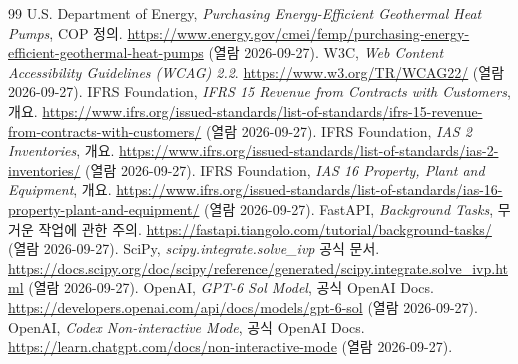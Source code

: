 \documentclass[11pt,a4paper]{article}
\begin{document}
\begin{thebibliography}{99}
 U.S. Department of Energy, \emph{Purchasing Energy-Efficient Geothermal Heat Pumps}, COP 정의. \url{https://www.energy.gov/cmei/femp/purchasing-energy-efficient-geothermal-heat-pumps} (열람 2026-09-27).
 W3C, \emph{Web Content Accessibility Guidelines (WCAG) 2.2}. \url{https://www.w3.org/TR/WCAG22/} (열람 2026-09-27).
 IFRS Foundation, \emph{IFRS 15 Revenue from Contracts with Customers}, 개요. \url{https://www.ifrs.org/issued-standards/list-of-standards/ifrs-15-revenue-from-contracts-with-customers/} (열람 2026-09-27).
 IFRS Foundation, \emph{IAS 2 Inventories}, 개요. \url{https://www.ifrs.org/issued-standards/list-of-standards/ias-2-inventories/} (열람 2026-09-27).
 IFRS Foundation, \emph{IAS 16 Property, Plant and Equipment}, 개요. \url{https://www.ifrs.org/issued-standards/list-of-standards/ias-16-property-plant-and-equipment/} (열람 2026-09-27).
 FastAPI, \emph{Background Tasks}, 무거운 작업에 관한 주의. \url{https://fastapi.tiangolo.com/tutorial/background-tasks/} (열람 2026-09-27).
 SciPy, \emph{scipy.integrate.solve\_ivp} 공식 문서. \url{https://docs.scipy.org/doc/scipy/reference/generated/scipy.integrate.solve_ivp.html} (열람 2026-09-27).
 OpenAI, \emph{GPT-6 Sol Model}, 공식 OpenAI Docs. \url{https://developers.openai.com/api/docs/models/gpt-6-sol} (열람 2026-09-27).
 OpenAI, \emph{Codex Non-interactive Mode}, 공식 OpenAI Docs. \url{https://learn.chatgpt.com/docs/non-interactive-mode} (열람 2026-09-27).
\end{thebibliography}
\end{document}
